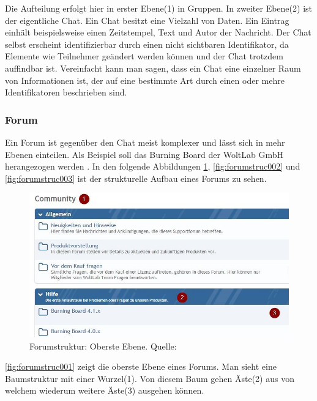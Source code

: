 \documentclass[a4paper]{article}
\begin{document}
	Die Aufteilung erfolgt hier in erster Ebene(1) in Gruppen. In zweiter Ebene(2)
	ist der eigentliche Chat. Ein Chat besitzt eine Vielzahl von Daten. Ein
	Eintrag einhält beispielsweise einen Zeitstempel, Text und Autor der
	Nachricht. Der Chat selbst erscheint identifizierbar durch einen nicht
	sichtbaren Identifikator, da Elemente wie Teilnehmer geändert werden können
	und der Chat trotzdem auffindbar ist. Vereinfacht kann man sagen, dass ein
	Chat eine einzelner Raum von Informationen ist, der auf eine bestimmte Art
	durch einen oder mehre Identifikatoren beschrieben sind.
	
	\subsubsection{Forum}	
	
	Ein Forum ist gegenüber den Chat meist komplexer und lässt sich in mehr
	Ebenen einteilen. Als Beispiel soll das	Burning Board der WoltLab GmbH
	herangezogen werden \cite{BB}. In den folgende Abbildungen
	\ref{fig:forumstruc001}, \ref{fig:forumstruc002} und \ref{fig:forumstruc003}
	ist der strukturelle Aufbau eines Forums zu sehen.
	
	\begin{figure}[H] 
		\centerline{
			\includegraphics[scale=0.65]{../Bilder/forumstruc001.jpg}
		}
		\caption{Forumstruktur: Oberste Ebene. Quelle: \cite{BB}}
		\label{fig:forumstruc001}
	\end{figure}	
	
	\autoref{fig:forumstruc001} zeigt die oberste Ebene eines Forums. Man sieht
	eine Baumstruktur mit einer Wurzel(1). Von diesem Baum gehen Äste(2) aus
	von welchem wiederum weitere Äste(3) ausgehen können.
	
\end{document}
